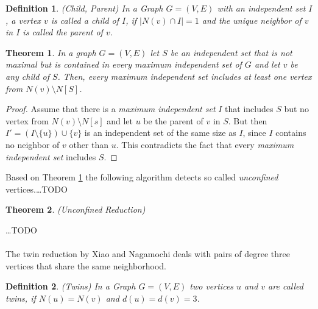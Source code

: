 \documentclass[]{article}
\newtheorem{theorem}{Theorem}
\newtheorem{definition}{Definition}
\begin{document}
\begin{definition} (Child, Parent) In a Graph $G=(V,E)$ with an \textit{independent set} $I$, a vertex $v$ is called a child of $I$, if $|N(v)\cap I| = 1$ and the unique neighbor of $v$ in $I$ is called the parent of $v$.
\end{definition}

\begin{theorem} \label{unconfined}
	In a graph $G=(V,E)$ let $S$ be an \textit{independent set} that is not maximal but is contained in every \textit{maximum independent set} of $G$ and let $v$ be any child of $S$. Then, every \textit{maximum independent set} includes at least one vertex from $N(v)\setminus N[S]$.
\end{theorem}
\begin{proof}
	Assume that there is a \textit{maximum independent set}  $I$ that includes $S$ but no vertex from $N(v)\setminus N[s]$ and let $u$ be the parent of $v$ in $S$. But then $I'=(I\setminus\{u\})\cup\{v\}$ is an independent set of the same size as $I$, since $I$ contains no neighbor of $v$ other than $u$. This contradicts the fact that every \textit{maximum independent set} includes $S$.
\end{proof}

Based on Theorem \ref{unconfined} the following algorithm detects so called \textit{unconfined} vertices.\dots TODO


\begin{theorem}(Unconfined Reduction)
	
\end{theorem}
\dots TODO\\\\
The twin reduction by Xiao and Nagamochi \cite{XiaoUnconfined} deals with pairs of degree three vertices that share the same neighborhood.

\begin{definition}(Twins)
	In a Graph $G=(V,E)$ two vertices $u$ and $v$ are called twins, if $N(u) = N(v)$ and $d(u) = d(v) = 3$.
\end{definition}
\end{document}
